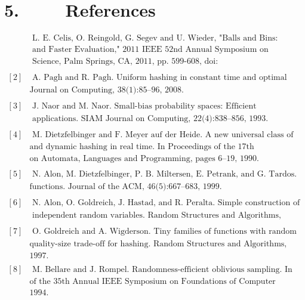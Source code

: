 \documentclass[a4paper, english]{paper}
\begin{document}
	\section{5. $\qquad$ References}
\begin{align*}
	[1]&\text{ L. E. Celis, O. Reingold, G. Segev and U. Wieder, "Balls and Bins: Smaller Hash Families}\\
	&\text{ and Faster Evaluation," 2011 IEEE 52nd Annual Symposium on Foundations of Computer }\\
	&\text{ Science, Palm Springs, CA, 2011, pp. 599-608, doi: 10.1109/FOCS.2011.49.}\\
&\\
	[2] &\text{ A. Pagh and R. Pagh. Uniform hashing in constant time and optimal space. SIAM}\\
	&\text{Journal on Computing, 38(1):85–96, 2008.}\\
&\\
	[3] &\text{ J. Naor and M. Naor. Small-bias probability spaces: Efficient constructions and}\\
	&\text{ applications. SIAM Journal on Computing, 22(4):838–856, 1993.}\\
&\\
	[4]&\text{ M. Dietzfelbinger and F. Meyer auf der Heide. A new universal class of hash functions}\\
	&\text{and dynamic hashing in real time. In Proceedings of the 17th International Colloquium}\\
	&\text{on Automata, Languages and Programming, pages 6–19, 1990.}\\
&\\
	[5]&\text{ N. Alon, M. Dietzfelbinger, P. B. Miltersen, E. Petrank, and G. Tardos. Linear hash}\\
	&\text{functions. Journal of the ACM, 46(5):667–683, 1999.}\\
&\\
	[6]&\text{ N. Alon, O. Goldreich, J. Hastad, and R. Peralta. Simple construction of almost kwise}\\
	&\text{ independent random variables. Random Structures and Algorithms, 3(3):289–304, 1992.}\\
&\\
	[7]&\text{ O. Goldreich and A. Wigderson. Tiny families of functions with random properties: A}\\
	&\text{quality-size trade-off for hashing. Random Structures and Algorithms, 11(4):315–343,}\\
	&\text{1997.}\\
&\\
	[8]&\text{ M. Bellare and J. Rompel. Randomness-efficient oblivious sampling. In Proceedings} \\
	&\text{of the 35th Annual IEEE Symposium on Foundations of Computer Science, pages 276–287,}\\
	&\text{1994.}
\end{align*}
\end{document}
